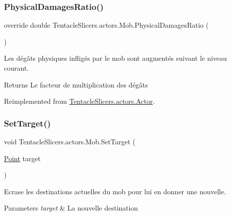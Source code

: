 \subsubsection{\texorpdfstring{Physical\+Damages\+Ratio()}{PhysicalDamagesRatio()}}
{\footnotesize\ttfamily override double Tentacle\+Slicers.\+actors.\+Mob.\+Physical\+Damages\+Ratio (\begin{DoxyParamCaption}{ }\end{DoxyParamCaption})\hspace{0.3cm}{\ttfamily [virtual]}}



Les dégâts physiques infligés par le mob sont augmentés suivant le niveau courant. 

\begin{DoxyReturn}{Returns}
Le facteur de multiplication des dégâts 
\end{DoxyReturn}


Reimplemented from \hyperlink{class_tentacle_slicers_1_1actors_1_1_actor_a8041088479e124a66c24d185f5385b2f}{Tentacle\+Slicers.\+actors.\+Actor}.

\mbox{\label{class_tentacle_slicers_1_1actors_1_1_mob_ad3faa313dde3be8458da5efa209e68cb}} 
\subsubsection{\texorpdfstring{Set\+Target()}{SetTarget()}}
{\footnotesize\ttfamily void Tentacle\+Slicers.\+actors.\+Mob.\+Set\+Target (\begin{DoxyParamCaption}\item[{\hyperlink{class_tentacle_slicers_1_1general_1_1_point}{Point}}]{target }\end{DoxyParamCaption})}



Ecrase les destinations actuelles du mob pour lui en donner une nouvelle. 


\begin{DoxyParams}{Parameters}
{\em target} & La nouvelle destination \\
\hline
\end{DoxyParams}
\mbox{\label{class_tentacle_slicers_1_1actors_1_1_mob_a4964c017e117b1d5af224f65a16ea127}} 
